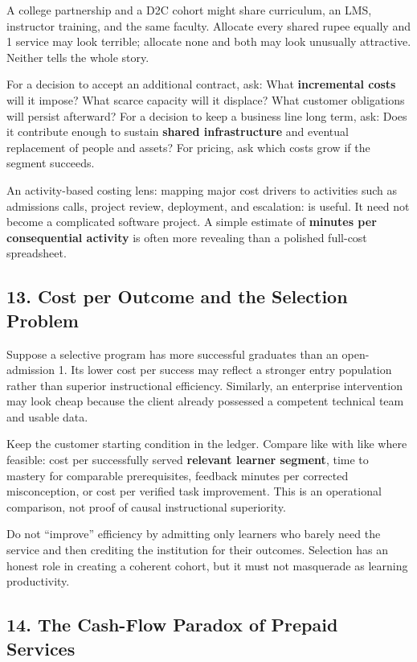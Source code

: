 A college partnership and a D2C cohort might share curriculum, an LMS, instructor training, and the same faculty. Allocate every shared rupee equally and 1 service may look terrible; allocate none and both may look unusually attractive. Neither tells the whole story.

For a decision to accept an additional contract, ask: What \textbf{incremental costs} will it impose? What scarce capacity will it displace? What customer obligations will persist afterward? For a decision to keep a business line long term, ask: Does it contribute enough to sustain \textbf{shared infrastructure} and eventual replacement of people and assets? For pricing, ask which costs grow if the segment succeeds.

An activity-based costing lens: mapping major cost drivers to activities such as admissions calls, project review, deployment, and escalation: is useful. It need not become a complicated software project. A simple estimate of \textbf{minutes per consequential activity} is often more revealing than a polished full-cost spreadsheet.

\subsection*{13. Cost per Outcome and the Selection Problem}

Suppose a selective program has more successful graduates than an open-admission 1. Its lower cost per success may reflect a stronger entry population rather than superior instructional efficiency. Similarly, an enterprise intervention may look cheap because the client already possessed a competent technical team and usable data.

Keep the customer starting condition in the ledger. Compare like with like where feasible: cost per successfully served \textbf{relevant learner segment}, time to mastery for comparable prerequisites, feedback minutes per corrected misconception, or cost per verified task improvement. This is an operational comparison, not proof of causal instructional superiority.

Do not ``improve'' efficiency by admitting only learners who barely need the service and then crediting the institution for their outcomes. Selection has an honest role in creating a coherent cohort, but it must not masquerade as learning productivity.

\subsection*{14. The Cash-Flow Paradox of Prepaid Services}

